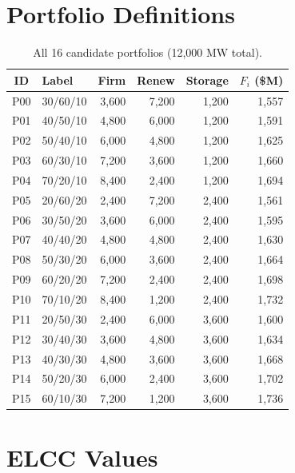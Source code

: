 \documentclass[11pt]{article}
\begin{document}
\section{Portfolio Definitions}\label{app:portfolios}

\begin{table}[H]
\centering
\caption{All 16 candidate portfolios (12,000 MW total).}\label{tab:allport}
\small
\begin{tabular}{clrrrr}
\toprule
ID & Label & Firm & Renew & Storage & $F_i$ (\$M) \\
\midrule
P00 & 30/60/10 & 3,600 & 7,200 & 1,200 & 1,557 \\
P01 & 40/50/10 & 4,800 & 6,000 & 1,200 & 1,591 \\
P02 & 50/40/10 & 6,000 & 4,800 & 1,200 & 1,625 \\
P03 & 60/30/10 & 7,200 & 3,600 & 1,200 & 1,660 \\
P04 & 70/20/10 & 8,400 & 2,400 & 1,200 & 1,694 \\
P05 & 20/60/20 & 2,400 & 7,200 & 2,400 & 1,561 \\
P06 & 30/50/20 & 3,600 & 6,000 & 2,400 & 1,595 \\
P07 & 40/40/20 & 4,800 & 4,800 & 2,400 & 1,630 \\
P08 & 50/30/20 & 6,000 & 3,600 & 2,400 & 1,664 \\
P09 & 60/20/20 & 7,200 & 2,400 & 2,400 & 1,698 \\
P10 & 70/10/20 & 8,400 & 1,200 & 2,400 & 1,732 \\
P11 & 20/50/30 & 2,400 & 6,000 & 3,600 & 1,600 \\
P12 & 30/40/30 & 3,600 & 4,800 & 3,600 & 1,634 \\
P13 & 40/30/30 & 4,800 & 3,600 & 3,600 & 1,668 \\
P14 & 50/20/30 & 6,000 & 2,400 & 3,600 & 1,702 \\
P15 & 60/10/30 & 7,200 & 1,200 & 3,600 & 1,736 \\
\bottomrule
\end{tabular}
\end{table}


\section{ELCC Values}\label{app:elcc}
\end{document}
